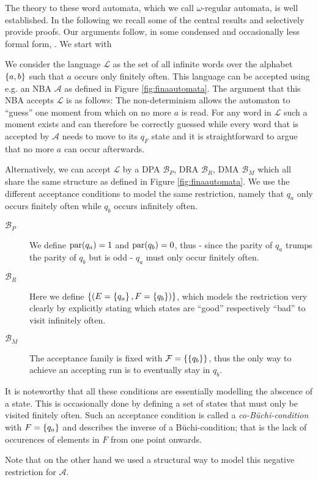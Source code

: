 The theory to these word automata, which we call $\omega$-regular automata, is
well established. In the following we recall some of the central results and
selectively provide proofs. Our arguments follow, in some condensed and
occasionally less formal form, \cite[Chapter 1]{AutoLogInfGames}. We start with
\begin{example}
  We consider the language $\mathcal{L}$ as the set of all infinite
  words over the alphabet $\left\{a,b\right\}$ such that $a$ occurs only finitely often.
  This language can be accepted using e.g. an \ac{NBA} $\mathcal{A}$ as defined 
  in Figure \ref{fig:finaautomata}. The argument that this \ac{NBA} accepts
  $\mathcal{L}$ is as follows: The non-determinism allows the automaton to
  \enquote{guess} one moment from which on no more $a$ is read. For any word in 
  $\mathcal{L}$ such a moment exists and can therefore be correctly guessed
  while every word that is accepted by $\mathcal{A}$ needs to move to its
  $q_{F}$ state and it is straightforward to argue that no more $a$ can occur
  afterwards.

  Alternatively, we can accept $\mathcal{L}$ by a \ac{DPA} $\mathcal{B}_{P}$,
  \ac{DRA} $\mathcal{B}_{R}$, \ac{DMA}
  $\mathcal{B}_{M}$ which all share the same structure as defined in Figure
  \ref{fig:finaautomata}. We use the different acceptance conditions to model
  the same restriction, namely that $q_{a}$ only occurs finitely often while
  $q_{b}$ occurs infinitely often.
  \begin{description}
    \item [$\mathcal{B}_{P}$] We define $\operatorname{par}(q_{a}) = 1$ and
      $\operatorname{par}(q_{b}) = 0$, thus - since the parity of $q_{a}$ trumps the
      parity of $q_{b}$ but is odd - $q_{a}$ must only occur finitely often.
    \item [$\mathcal{B}_{R}$] Here we define $\left\{\left(E = \left\{q_{a}\right\},
      F = \left\{q_{b}\right\}\right)\right\}$, which models the restriction very clearly by
      explicitly stating which states are \enquote{good} respectively
      \enquote{bad} to visit infinitely often.
    \item [$\mathcal{B}_{M}$] The acceptance family is fixed with
      $\mathcal{F} = \left\{\left\{q_{b}\right\}\right\}$, thus the only way to achieve an
      accepting run is to eventually stay in $q_{b}$.
  \end{description}
  It is noteworthy that all these conditions are essentially modelling the
  abscence of a state. This is occasionally done by defining a set of states
  that must only be visited finitely often. Such an acceptance condition is
  called a \emph{co-Büchi-condition} with $F = \left\{q_{a}\right\}$ and describes the
  inverse of a Büchi-condition; that is the lack of occurences of elements in
  $F$ from one point onwards.

  Note that on the other hand we used a structural way to model this negative
  restriction for $\mathcal{A}$.
  \label{ex:fina}
\end{example}

